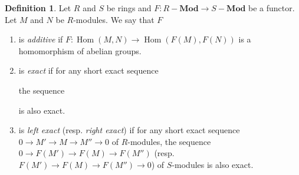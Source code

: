 \documentclass[10pt,letterpaper,cm]{nupset}
\theoremstyle{definition}
\newtheorem{definition}{Definition}[subsection]
\theoremstyle{theorem}
\theoremstyle{remark}
\newcommand{\1}{\mathbf{1}}
\newcommand{\0}{\vec 0}
\DeclareMathOperator{\Hom}{Hom}
\begin{document}
\begin{definition} Let $R$ and $S$ be rings and $F: R{-} \mathbf{Mod} \to S{-}\mathbf{Mod}$ be a functor. Let $M$ and $N$ be $R$-modules. We say that $F$
\begin{enumerate}
\item is \textit{additive} if $F : \Hom(M, N) \to \Hom(F(M), F(N))$ is a homomorphism of abelian groups.
\item is \textit{exact} if for any short exact sequence 
the sequence
 is also exact.
\item is \textit{left exact} (resp. \textit{right exact}) if for any short exact sequence $0 \to M' \to M \to M'' \to 0$ of $R$-modules, the sequence $0 \to F(M') \to F(M) \to F(M'')$ (resp. $F(M') \to F(M) \to F(M'') \to 0$) of $S$-modules is also exact.
\end{enumerate}
\end{definition}
\end{document}
